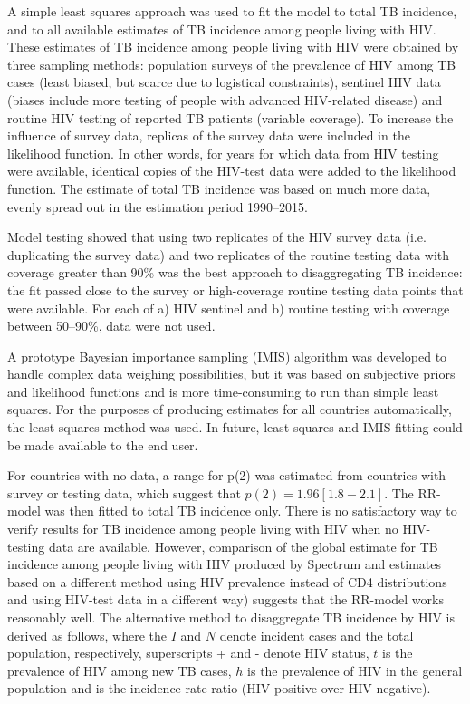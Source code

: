 A simple least squares approach was used to fit the model to total TB incidence, and to all available estimates of TB incidence among people living with HIV. These estimates of TB incidence among people living with HIV were obtained by three sampling methods: population surveys of the prevalence of HIV among TB cases (least biased, but scarce due to logistical constraints), sentinel HIV data (biases include more testing of people with advanced HIV-related disease) and routine HIV testing of reported TB patients (variable coverage). To increase the influence of survey data, replicas of the survey data were included in the likelihood function. In other words, for years for which data from HIV testing were available, identical copies of the HIV-test data were added to the likelihood function. The estimate of total TB incidence was based on much more data, evenly spread out in the estimation period 1990–2015.

Model testing showed that using two replicates of the HIV survey data (i.e. duplicating the survey data) and two replicates of the routine testing data with coverage greater than 90\% was the best approach to disaggregating TB incidence: the fit passed close to the survey or high-coverage routine testing data points that were available. For each of a) HIV sentinel and b) routine testing with coverage between 50–90\%, data were not used.

A prototype Bayesian importance sampling (IMIS) algorithm was developed to handle complex data weighing possibilities, but it was based on subjective priors and likelihood functions and is more time-consuming to run than simple least squares. For the purposes of producing estimates for all countries automatically, the least squares method was used. In future, least squares and IMIS fitting could be made available to the end user.


For countries with no data, a range for p(2) was estimated from countries with survey or testing data, which suggest that $p(2) = 1.96 [1.8-2.1]$. The RR-model was then fitted to total TB incidence only. There is no satisfactory way to verify results for TB incidence among people living with HIV when no HIV-testing data are available. However, comparison of the global estimate for TB incidence among people living with HIV produced by Spectrum and estimates based on a different method using HIV prevalence instead of CD4 distributions and using  HIV-test data in a different way) suggests that the RR-model works reasonably well. The alternative method to disaggregate TB incidence by HIV is derived as follows, where the $I$ and $N$ denote incident cases and the total population, respectively, superscripts + and - denote HIV status, $t$ is the prevalence of HIV among new TB cases, $h$ is the prevalence of HIV in the general population and \rho is the incidence rate ratio (HIV-positive over HIV-negative).

